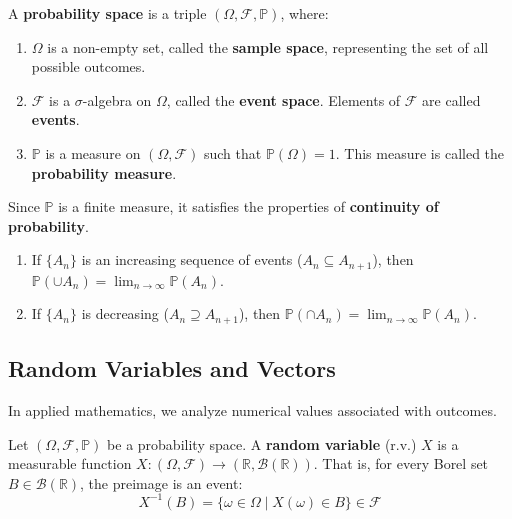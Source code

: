 \begin{definition}
A \textbf{probability space} is a triple $(\Omega, \mathcal{F}, \mathbb{P})$, where:
\begin{enumerate}
    \item $\Omega$ is a non-empty set, called the \textbf{sample space}, representing the set of all possible outcomes.
    \item $\mathcal{F}$ is a $\sigma$-algebra on $\Omega$, called the \textbf{event space}. Elements of $\mathcal{F}$ are called \textbf{events}.
    \item $\mathbb{P}$ is a measure on $(\Omega, \mathcal{F})$ such that $\mathbb{P}(\Omega) = 1$. This measure is called the \textbf{probability measure}.
\end{enumerate}
\end{definition}

Since $\mathbb{P}$ is a finite measure, it satisfies the properties of \textbf{continuity of probability}.

\begin{proposition}[Continuity]
\begin{enumerate}
    \item If $\{A_n\}$ is an increasing sequence of events ($A_n \subseteq A_{n+1}$), then $\mathbb{P}(\cup A_n) = \lim_{n \to \infty} \mathbb{P}(A_n)$.
    \item If $\{A_n\}$ is decreasing ($A_n \supseteq A_{n+1}$), then $\mathbb{P}(\cap A_n) = \lim_{n \to \infty} \mathbb{P}(A_n)$.
\end{enumerate}
\end{proposition}

\subsection{Random Variables and Vectors}

In applied mathematics, we analyze numerical values associated with outcomes.

\begin{definition}
Let $(\Omega, \mathcal{F}, \mathbb{P})$ be a probability space. A \textbf{random variable} (r.v.) $X$ is a measurable function $X: (\Omega, \mathcal{F}) \to (\mathbb{R}, \mathcal{B}(\mathbb{R}))$.
That is, for every Borel set $B \in \mathcal{B}(\mathbb{R})$, the preimage is an event:
\[ X^{-1}(B) = \{ \omega \in \Omega \mid X(\omega) \in B \} \in \mathcal{F} \]
\end{definition}


